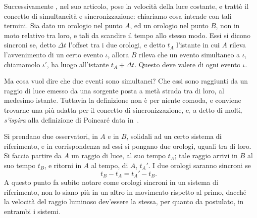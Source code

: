 Successivamente \ein, nel suo articolo, pose la velocit\`a della luce
costante, e tratt\`o il concetto di simultaneit\`a e sincronizzazione:
chiariamo cosa intende \ein{} con tali termini. Sia dato un orologio nel
punto $A$, ed un orologio nel punto $B$, non in moto relativo tra loro,
e tali da scandire il tempo allo stesso modo. Essi si dicono sincroni
se, detto $\Delta t$ l'offset tra i due orologi, e detto $t_{A}$
l'istante in cui $A$ rileva l'avvenimento di un certo evento $\iota$,
allora $B$ rileva che un evento simultaneo a $\iota$, chiamamolo
$\iota'$, ha luogo all'istante $t_{A} + \Delta t$. Questo deve valere di
ogni evento $\iota$.

Ma cosa vuol dire che due eventi sono simultanei? Che essi sono
raggiunti da un raggio di luce emesso da una sorgente posta a met\`a
strada tra di loro, al medesimo istante. Tuttavia la definizione non \`e
per niente comoda, e conviene trovarne una pi\`u adatta per il concetto
di sincronizzazione, e, a detto di molti, \ein{} \emph{s'ispira} alla
definizione di Poincar\'e data in~\cite{carro3}.

Si prendano due osservatori, in $A$ e in $B$, solidali ad un certo
sistema di riferimento, e in corrispondenza ad essi si pongano due
orologi, uguali tra di loro. Si faccia partire da $A$ un raggio di luce,
al suo tempo $t_A$; tale raggio arrivi in $B$ al suo tempo $t_B$, e
ritorni in $A$ al tempo, di $A$, $t_A'$. I due orologi saranno sincroni se
\begin{equation}
  t_{B} - t_{A} = t_{A}' - t_{B}.  
  \label{eq:sincroni}
\end{equation}
A questo punto \ein{} fa subito notare come orologi sincroni in un
sistema di riferimento, non lo siano pi\`u in un altro in movimento
rispetto al primo, dacch\'e la velocit\`a del raggio luminoso
dev'essere la stessa, per quanto da \ein{} postulato, in entrambi i
sistemi.


